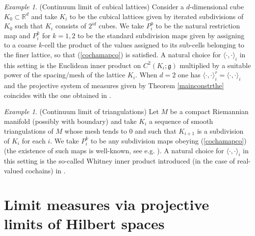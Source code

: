 \documentclass[11pt,reqno]{amsart}
\numberwithin{equation}{section}
\theoremstyle{remark}
\newtheorem{example}[theorem]{Example}
\theoremstyle{rmdefinition}
\begin{document}
\begin{example}\label{contlimcubexa}(Continuum limit of cubical lattices)
Consider a $d$-dimensional cube $K_0  \subset \mathbb{R}^d$ and take $K_i$ to be the cubical lattices given by iterated subdivisions of $K_0$ such that $K_i$ consists of $2^{id}$ cubes. We take $P_i^0$ to be the natural restriction map and $P_i^k$ for $k=1,2$ to be the standard subdivision maps given by assigning to a coarse $k$-cell the product of the values assigned to its sub-cells belonging to the finer lattice, so that (\ref{cochamapco}) is satisfied. A natural choice for $\langle \cdot, \cdot \rangle_i$ in this setting is the Euclidean inner product on $C^2(K_i;\mathfrak g)$ multiplied by a suitable power of the spacing/mesh of the lattice $K_i$. When $d=2$ one has $\langle \cdot, \cdot \rangle^r_i=\langle \cdot, \cdot \rangle_i$ and the projective system of measures given by Theorem \ref{mainconstrthe} coincides with the one obtained in \cite{VM}.
\end{example}

\begin{example}(Continuum limit of triangulations)
Let $M$ be a compact Riemannian manifold (possibly with boundary) and take $K_i$ a sequence of smooth triangulations of $M$ whose mesh tends to 0 and such that $K_{i+1}$ is a subdivision of $K_{i}$ for each $i$. We take $P_i^k$ to be any subdivision maps obeying (\ref{cochamapco}) (the existence of such maps is well-known, see e.g. \cite[Chapter 2, \S 17]{Mu}). A natural choice for $\langle \cdot, \cdot \rangle_i$ in this setting is the so-called Whitney inner product introduced (in the case of real-valued cochains) in \cite{Do}.
\end{example}

\section{Limit measures via projective limits of Hilbert spaces}\label{limmeassect}
\end{document}
